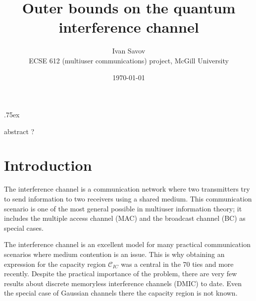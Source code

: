 \documentclass[aps,11pt,twoside,letterpaper]{article}
\newcommand{\ICcap}{  \ensuremath{\mathcal C}_{IC} }
\begin{document}
\title{{\Large Outer bounds on the quantum interference channel} }
\date{\today} 
\author{Ivan Savov \\
    ECSE 612 (multiuser communications) project, McGill University}




\parskip .75ex             %
\maketitle



abstract ?

\section{Introduction}


    The interference channel is a communication network where two transmitters try to send
    information to two receivers using a shared medium. 
    This communication scenario is one of the most general possible in multiuser information
    theory; it includes the multiple access channel (MAC) and the broadcast channel (BC)
    as special cases.
    
    The interference channel is an excellent model for many practical communication scenarios
    where medium contention is an issue. This is why obtaining an expression for the capacity region
    $\ICcap$ was a central in the 70 ties and more recently.
    Despite the practical importance of the problem, there are very few results about 
    discrete memoryless interference channels (DMIC) to date.
    Even the special case of Gaussian channels there the capacity region is not known.
    
\end{document}
